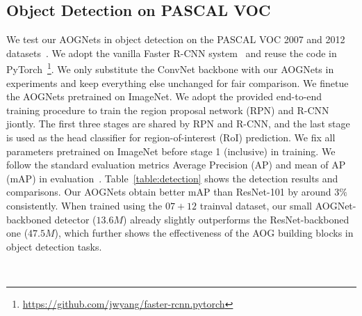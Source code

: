 \documentclass[10pt,twocolumn,letterpaper]{article}
\begin{document}
\subsection{Object Detection on PASCAL VOC}
We test our AOGNets in object detection on the PASCAL VOC 2007 and 2012 datasets~\cite{VOC}. We adopt the vanilla Faster R-CNN system~\cite{FasterRCNN} and reuse the code in PyTorch~\footnote{\url{https://github.com/jwyang/faster-rcnn.pytorch}}. We only substitute the ConvNet backbone with our AOGNets in experiments and keep everything else unchanged for fair comparison. We finetue the AOGNets pretrained on ImageNet. We adopt the provided end-to-end training procedure to train the region proposal network (RPN) and R-CNN jiontly. The first three stages are shared by RPN and R-CNN, and the last stage is used as the head classifier for region-of-interest (RoI) prediction. We fix all parameters pretrained on ImageNet before stage 1 (inclusive) in training. We follow the standard evaluation metrics Average Precision (AP) and mean of AP (mAP) in evaluation~\cite{VOC}.  
Table~\ref{table:detection} shows the detection results and comparisons. Our AOGNets obtain better mAP than ResNet-101 by around $3\%$ consistently. When trained using the $07+12$ trainval dataset, our small AOGNet-backboned detector  ($13.6M$) already slightly outperforms the ResNet-backboned one ($47.5M$), which further shows the effectiveness of the AOG building blocks in object detection tasks.


 \begin{table}
    \centering
    \small{
    }
    \\ [1ex]
    \caption{An ablation study of our AOGNets using the mean error rate across 5 runs. In the first two rows, the AOGNets use full structure, and the pruned structure in the last two rows. The feature dimensions of node operations are accordingly specified to keep model sizes comparable. %
    }\label{table:ablation-cifar} 
\end{table}
\end{document}

